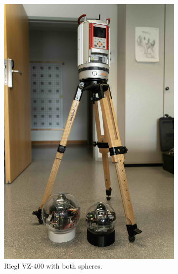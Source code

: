 \documentclass[conference]{IEEEtran}
\begin{document}
\begin{figure}[t]
\centering
\begin{subfigure}{0.48\columnwidth}
        \centering
        \includegraphics[width=\textwidth]{pics/riegl.jpg}
        \caption{Riegl VZ-400 with both spheres.}
        \label{fig:riegl}\end{subfigure}
\hfill
\begin{subfigure}{0.48\columnwidth}
        \centering

\end{subfigure}
\end{figure}
\end{document}

